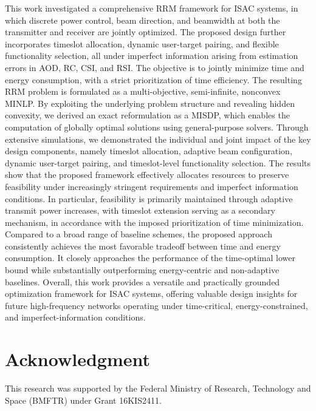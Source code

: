 \documentclass[10pt,journal,compsoc]{IEEEtran}
\theoremstyle{myremark}
\theoremstyle{myexample}
\begin{document}
This work investigated a comprehensive \gls{RRM} framework for \gls{ISAC} systems, in which discrete power control, beam direction, and beamwidth at both the transmitter and receiver are jointly optimized. The proposed design further incorporates timeslot allocation, dynamic user-target pairing, and flexible functionality selection, all under imperfect information arising from estimation errors in \gls{AOD}, \gls{RC}, \gls{CSI}, and \gls{RSI}. The objective is to jointly minimize time and energy consumption, with a strict prioritization of time efficiency. The resulting \gls{RRM} problem is formulated as a multi-objective, semi-infinite, nonconvex \gls{MINLP}. By exploiting the underlying problem structure and revealing hidden convexity, we derived an exact reformulation as a \gls{MISDP}, which enables the computation of globally optimal solutions using general-purpose solvers. Through extensive simulations, we demonstrated the individual and joint impact of the key design components, namely timeslot allocation, adaptive beam configuration, dynamic user-target pairing, and timeslot-level functionality selection. The results show that the proposed framework effectively allocates resources to preserve feasibility under increasingly stringent requirements and imperfect information conditions. In particular, feasibility is primarily maintained through adaptive transmit power increases, with timeslot extension serving as a secondary mechanism, in accordance with the imposed prioritization of time minimization. Compared to a broad range of baseline schemes, the proposed approach consistently achieves the most favorable tradeoff between time and energy consumption. It closely approaches the performance of the time-optimal lower bound while substantially outperforming energy-centric and non-adaptive baselines. Overall, this work provides a versatile and practically grounded optimization framework for \gls{ISAC} systems, offering valuable design insights for future high-frequency networks operating under time-critical, energy-constrained, and imperfect-information conditions.  


\section*{Acknowledgment} \label{sec:acknowledgment}
This research was supported by the Federal Ministry of Research, Technology and Space (BMFTR) under Grant 16KIS2411.





\end{document}
